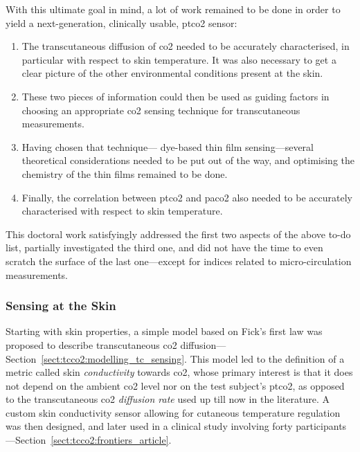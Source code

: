 With this ultimate goal in mind, a lot of work remained to be done in order to yield a next-generation, clinically usable, \gls{ptco2} sensor:
\begin{enumerate}
	\item The transcutaneous diffusion of \gls{co2} needed to be accurately characterised, in particular with respect to skin temperature. It was also necessary to get a clear picture of the other environmental conditions present at the skin.
	\item These two pieces of information could then be used as guiding factors in choosing an appropriate \gls{co2} sensing technique for transcutaneous measurements.
	\item Having chosen that technique---\ie{} dye-based thin film sensing---several theoretical considerations needed to be put out of the way, and optimising the chemistry of the thin films remained to be done.
	\item Finally, the correlation between \gls{ptco2} and \gls{paco2} also needed to be accurately characterised with respect to skin temperature.
\end{enumerate}
This doctoral work satisfyingly addressed the first two aspects of the above to-do list, partially investigated the third one, and did not have the time to even scratch the surface of the last one---except for indices related to micro-circulation measurements.

\subsubsection{Sensing at the Skin}

Starting with skin properties, a simple model based on Fick's first law was proposed to describe transcutaneous \gls{co2} diffusion---Section~\ref{sect:tcco2:modelling_tc_sensing}. This model led to the definition of a metric called skin \emph{conductivity} towards \gls{co2}, whose primary interest is that it does not depend on the ambient \gls{co2} level nor on the test subject's \gls{ptco2}, as opposed to the transcutaneous \gls{co2} \emph{diffusion rate} used up till now in the literature. A custom skin conductivity sensor allowing for cutaneous temperature regulation was then designed, and later used in a clinical study involving forty participants---Section~\ref{sect:tcco2:frontiers_article}.


